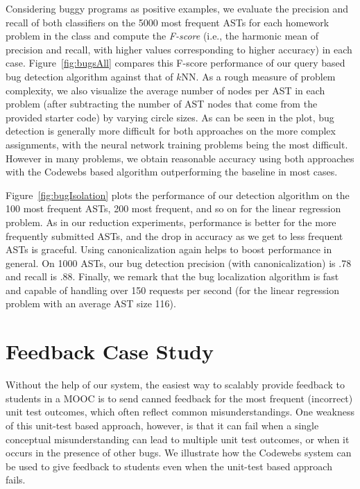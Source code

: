 Considering buggy programs as positive examples, we evaluate the precision and recall
of both classifiers on the 5000 most frequent ASTs for each homework problem in the class
and compute the \emph{F-score} (i.e., the harmonic mean of precision and recall, with higher values
corresponding to higher accuracy) in each case.
Figure~\ref{fig:bugsAll} compares this F-score performance of our query based bug detection
algorithm against that of $k$NN.   As a rough measure of problem complexity, we also visualize
 the average number of nodes per AST in each problem (after subtracting
the number of AST nodes that come from the provided starter code) by varying circle sizes.
As can be seen in the plot, bug detection is generally more difficult for both approaches on the more
complex assignments, with the neural network training problems being the most difficult.
However in many problems, we obtain reasonable accuracy using both approaches with
the Codewebs based algorithm outperforming the baseline in most cases.


Figure~\ref{fig:bugIsolation} plots the performance  of our detection algorithm
on the 100 most frequent ASTs, 200 most frequent, and so on for the linear regression problem.
As in our reduction experiments, performance is better 
for the more frequently submitted ASTs, and the drop in accuracy as we get to less frequent ASTs is graceful.
Using canonicalization again helps to boost performance in general.
On 1000 ASTs, our bug detection precision (with canonicalization) is .78 and recall is .88.
Finally, we remark that the bug localization algorithm is fast and capable of  handling over 150 requests per second (for the
linear regression problem with an average AST size 116).

\section{Feedback Case Study}
Without the help of our system, the easiest way to scalably provide feedback to students in a MOOC is to 
send canned feedback for the most frequent (incorrect) unit test outcomes, which often reflect common misunderstandings.
One weakness of this unit-test based approach, however, is that it can fail when a single conceptual misunderstanding
can lead to multiple unit test outcomes, or when it occurs in the presence of other bugs.
We  illustrate  how the Codewebs system can be used to give feedback to students even
when the unit-test based approach fails.

